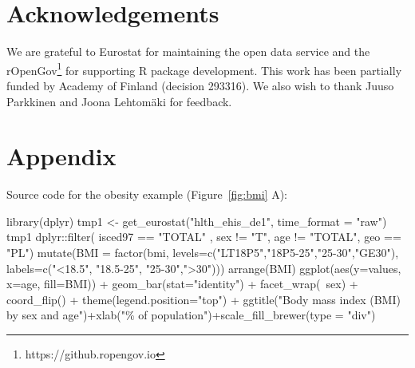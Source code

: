 \section*{Acknowledgements}

We are grateful to Eurostat for maintaining the open data service and
the rOpenGov\footnote{https://github.ropengov.io} for supporting R
package development. This work has been partially funded by Academy of
Finland (decision 293316). We also wish to thank Juuso Parkkinen and
Joona Lehtom{\"a}ki for feedback.




\address{Leo Lahti\\
  Department of Mathematics and Statistics\\
  PO Box 20014 University of Turku\\
  Finland\\}

\address{Janne Huovari\\
  Pellervo Economic Research PTT\\
  Eerikinkatu 28 A 00180 Helsinki\\
  Finland\\}

\address{Markus Kainu\\
  Research Department, The Social Insurance Institution of Finland\\
  PO Box 450, 00101 Helsinki\\
  Finland\\}

\address{Przemyslaw Biecek\\
  Faculty of Mathematics, Informatics, and Mechanics\\
  University of Warsaw\\
  Banacha 2, 02-097 Warsaw\\
  Poland\\}

\newpage

\section{Appendix}

Source code for the obesity example (Figure~\ref{fig:bmi} A):

\begin{example}
library(dplyr)
tmp1 <- get_eurostat("hlth_ehis_de1", time_format = "raw")
tmp1 %
  dplyr::filter( isced97 == "TOTAL" ,
          sex != "T",
          age != "TOTAL", geo == "PL") %
  mutate(BMI = factor(bmi, 
                      levels=c("LT18P5","18P5-25","25-30","GE30"), 
                      labels=c("<18.5", "18.5-25", "25-30",">30"))) %
  arrange(BMI) %
  ggplot(aes(y=values, x=age, fill=BMI)) +
  geom_bar(stat="identity") +
  facet_wrap(~sex) + coord_flip() +
  theme(legend.position="top") + ggtitle("Body mass index (BMI) by sex and age")+xlab("\% of population")+scale_fill_brewer(type = "div")
\end{example}


